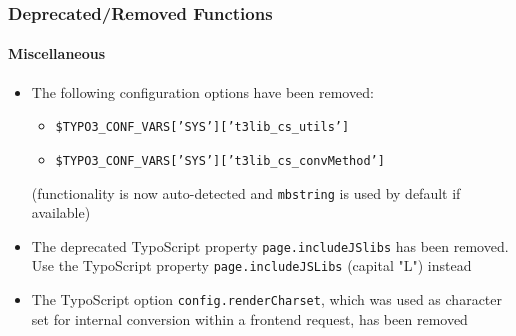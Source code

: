 \begin{frame}[fragile]
	\frametitle{Deprecated/Removed Functions}
	\framesubtitle{Miscellaneous}

	\begin{itemize}

		\item The following configuration options have been removed:

			\begin{itemize}
				\item \texttt{\$TYPO3\_CONF\_VARS['SYS']['t3lib\_cs\_utils']}
				\item \texttt{\$TYPO3\_CONF\_VARS['SYS']['t3lib\_cs\_convMethod']}
			\end{itemize}

			\small
				(functionality is now auto-detected and \texttt{mbstring} is
				used by default if available)
			\normalsize

		\item The deprecated TypoScript property \texttt{page.includeJSlibs} has
			been removed. Use the TypoScript property \texttt{page.includeJSLibs}
			(capital "L") instead

		\item The TypoScript option \texttt{config.renderCharset}, which was used
			as character set for internal conversion within a frontend request,
			has been removed

	\end{itemize}

\end{frame}

